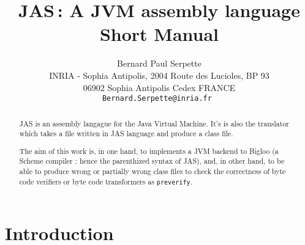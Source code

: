 \documentclass{article}
\date{}
\title{JAS\,: A JVM assembly language\\ Short Manual}
\author{Bernard Paul Serpette \\
  INRIA - Sophia Antipolis, 2004 Route des Lucioles, BP 93 \\
  06902 Sophia Antipolis Cedex    FRANCE \\
  \tt{Bernard.Serpette@inria.fr} }
\begin{document}
 \maketitle
\parindent=0pt

\newcommand{\IMAGE}[1]{
\vspace*{10pt}\parbox[t]{1cm}{\epsfxsize=10cm\epsfbox{#1}}
}

\newcommand{\kw}[1]{{\bf #1}}
\newcommand{\VN}[1]{{\fbox{#1}}\ }
\newcommand{\vn}[1]{{\underline{#1}}}

\begin{abstract}
JAS is an assembly langague for the Java Virtual Machine.
It's is also the translator which takes a file written in JAS language
and produce a class file.

The aim of this work is, in one hand, to implements a JVM backend to Bigloo
(a Scheme compiler : hence the parenthized syntax of JAS), and, in other
hand, to be able to produce wrong or partially wrong
class files to check the correctness of byte code verifiers or
byte code transformers as \verb|preverify|.
\end{abstract}


\section{Introduction}
\end{document}
